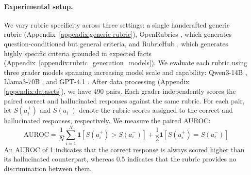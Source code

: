 \documentclass{article}
\begin{document}
\paragraph{Experimental setup.}
We vary rubric specificity across three settings: a single handcrafted generic rubric (Appendix~\ref{appendix:generic-rubric}), OpenRubrics \citep{liu2026openrubricsscalablesyntheticrubric}, which generates question-conditioned but general criteria, and RubricHub \citep{li-etal-2026-rubrichub}, which generates highly specific criteria grounded in expected facts (Appendix~\ref{appendix:rubric_generation_models}). We evaluate each rubric using three grader models spanning increasing model scale and capability: Qwen3-14B \citep{yang2025qwen3technicalreport}, Llama3-70B \citep{grattafiori2024llama3herdmodels}, and GPT-4.1 \citep{openai2025gpt41}.
After data processing (Appendix \ref{appendix:datasets}), we have 490 pairs.
Each grader independently scores the paired correct and hallucinated responses against the same rubric. For each pair, let $S(a_i^+)$ and $S(a_i^-)$ denote the rubric scores assigned to the correct and hallucinated responses, respectively. We measure the paired AUROC:
\begin{equation}
    \mathrm{AUROC} = \dfrac{1}{N} \sum_{i=1}^{N} \mathbf{1}\left[ S(a_i^+) > S(a_i^-) \right] + \dfrac{1}{2}\mathbf{1}\left[ S(a_i^+) = S(a_i^-) \right]
    \label{eq:auroc}
\end{equation}
An AUROC of 1 indicates that the correct response is always scored higher than its hallucinated counterpart, whereas 0.5 indicates that the rubric provides no discrimination between them.
\end{document}
